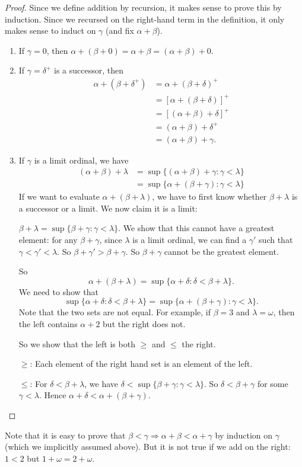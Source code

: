 \documentclass[a4paper]{article}
\begin{document}
\begin{proof}
  Since we define addition by recursion, it makes sense to prove this by induction. Since we recursed on the right-hand term in the definition, it only makes sense to induct on $\gamma$ (and fix $\alpha + \beta$).

\begin{enumerate}
  \item If $\gamma = 0$, then $\alpha + (\beta + 0) = \alpha + \beta = (\alpha + \beta) + 0$.
  \item If $\gamma = \delta^+$ is a successor, then
    \begin{align*}
      \alpha + (\beta + \delta^+) &= \alpha + (\beta + \delta)^+\\
      &= [\alpha + (\beta + \delta)]^+\\
      &= [(\alpha + \beta) + \delta]^+\\
      &= (\alpha + \beta) + \delta^+\\
      &= (\alpha + \beta) + \gamma.
    \end{align*}
  \item If $\gamma$ is a limit ordinal, we have
    \begin{align*}
      (\alpha + \beta) + \lambda &= \sup\{(\alpha + \beta) + \gamma: \gamma < \lambda\}\\
      &= \sup\{\alpha + (\beta + \gamma): \gamma < \lambda\}
    \end{align*}
    If we want to evaluate $\alpha + (\beta + \lambda)$, we have to first know whether $\beta + \lambda$ is a successor or a limit. We now claim it is a limit:

    $\beta + \lambda = \sup\{\beta + \gamma: \gamma < \lambda\}$. We show that this cannot have a greatest element: for any $\beta + \gamma$, since $\lambda$ is a limit ordinal, we can find a $\gamma'$ such that $\gamma < \gamma' < \lambda$. So $\beta + \gamma' > \beta + \gamma$. So $\beta + \gamma$ cannot be the greatest element.

    So
    \[
      \alpha + (\beta + \lambda) = \sup\{\alpha + \delta: \delta < \beta + \lambda\}.
    \]
    We need to show that
    \[
      \sup\{\alpha + \delta: \delta < \beta + \lambda\} = \sup\{\alpha + (\beta + \gamma): \gamma < \lambda\}.
    \]
    Note that the two sets are not equal. For example, if $\beta = 3$ and $\lambda = \omega$, then the left contains $\alpha + 2$ but the right does not.

    So we show that the left is both $\geq$ and $\leq$ the right.

    $\geq$: Each element of the right hand set is an element of the left.

    $\leq$: For $\delta < \beta + \lambda$, we have $\delta < \sup \{\beta + \gamma: \gamma < \lambda\}$. So $\delta < \beta + \gamma$ for some $\gamma < \lambda$. Hence $\alpha + \delta < \alpha + (\beta + \gamma)$.
\end{enumerate}
\end{proof}
Note that it is easy to prove that $\beta < \gamma \Rightarrow \alpha + \beta < \alpha + \gamma$ by induction on $\gamma$ (which we implicitly assumed above). But it is not true if we add on the right: $1 < 2$ but $1 + \omega = 2 + \omega$.
\end{document}
